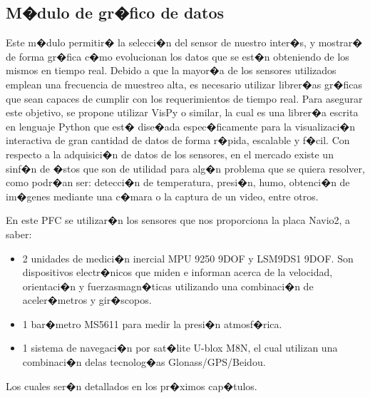 	\subsection{M�dulo de gr�fico de datos}
	
		Este m�dulo permitir� la selecci�n del sensor de nuestro inter�s, y mostrar� de forma gr�fica c�mo evolucionan los datos que se est�n obteniendo de los mismos en tiempo real.	Debido a que la mayor�a de los sensores utilizados emplean una frecuencia de muestreo alta, es necesario utilizar librer�as gr�ficas que sean capaces de cumplir con los 	requerimientos de tiempo real. Para asegurar este objetivo, se propone utilizar VisPy o	similar, la cual es una librer�a escrita en lenguaje Python que est� dise�ada espec�ficamente para la visualizaci�n interactiva de gran cantidad de datos de forma r�pida, escalable y f�cil. Con respecto a la adquisici�n de datos de los sensores, en el mercado existe un sinf�n de �stos que son de utilidad para alg�n problema que se quiera resolver, como podr�an ser:	detecci�n de temperatura, presi�n, humo, obtenci�n de im�genes mediante una c�mara o la	captura de un video, entre otros. 
		\par En este PFC se utilizar�n los sensores que nos proporciona la placa Navio2, a saber:
		
		\begin{itemize}
			\item  2 unidades de medici�n inercial MPU 9250 9DOF y LSM9DS1 9DOF. Son dispositivos electr�nicos que miden e informan acerca de la velocidad, orientaci�n y fuerzasmagn�ticas utilizando una combinaci�n de aceler�metros y gir�scopos.
			\item 1 bar�metro MS5611 para medir la presi�n atmosf�rica.
			\item 1 sistema de navegaci�n por sat�lite U-blox M8N, el cual utilizan una combinaci�n delas tecnolog�as Glonass/GPS/Beidou.
		\end{itemize}
	Los cuales ser�n detallados en los pr�ximos cap�tulos. 




